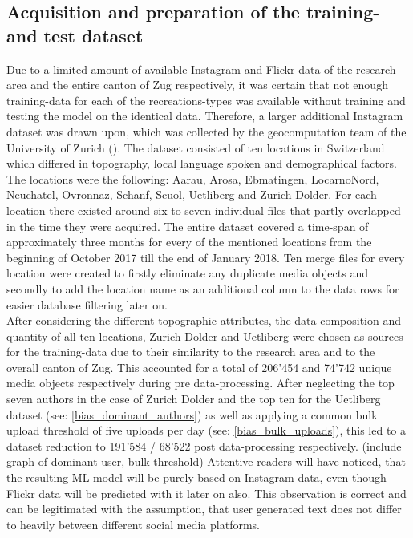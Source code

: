 \subsection{Acquisition and preparation of the training- and test dataset} \label{preparation_training_data}
Due to a limited amount of available Instagram and Flickr data of the research area and the entire canton of Zug respectively, it was certain that not enough training-data for each of the recreations-types was available without training and testing the model on the identical data. Therefore, a larger additional Instagram dataset was drawn upon, which was collected by the geocomputation team of the University of Zurich (\parencite{Gruzd2016}). The dataset consisted of ten locations in Switzerland which differed in topography, local language spoken and demographical factors. The locations were the following: Aarau, Arosa, Ebmatingen, LocarnoNord, Neuchatel, Ovronnaz, Schanf, Scuol, Uetliberg and Zurich Dolder. For each location there existed around six to seven individual files that partly overlapped in the time they were acquired. The entire dataset covered a time-span of approximately three months for every of the mentioned locations from the beginning of October 2017 till the end of January 2018.
Ten merge files for every location were created to firstly eliminate any duplicate media objects and secondly to add the location name as an additional column to the data rows for easier database filtering later on.\\
\newline
After considering the different topographic attributes, the data-composition and quantity of all ten locations, Zurich Dolder and Uetliberg were chosen as sources for the training-data due to their similarity to the research area and to the overall canton of Zug. This accounted for a total of 206'454 and 74'742 unique media objects respectively during pre data-processing. After neglecting the top seven authors in the case of Zurich Dolder and the top ten for the Uetliberg dataset (see: \ref{bias_dominant_authors}) as well as applying a common bulk upload threshold of five uploads per day (see: \ref{bias_bulk_uploads}), this led to a dataset reduction to 191'584 / 68'522 post data-processing respectively. (include graph of dominant user, bulk threshold) Attentive readers will have noticed, that the resulting ML model will be purely based on Instagram data, even though Flickr data will be predicted with it later on also. This observation is correct and can be legitimated with the assumption, that user generated text does not differ to heavily between different social media platforms.\\
